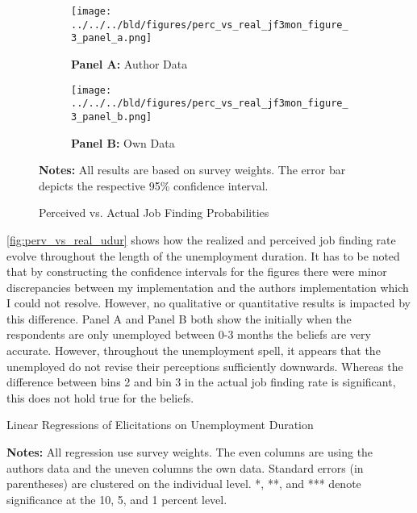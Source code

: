 \documentclass[11pt,a4paper,leqno]{article}
\begin{document}

\begin{center}
	
\end{center}

\begin{figure}[H]
	\begin{subfigure}[b]{0.5\textwidth}
		\centering
		\caption*{\scriptsize{\textbf{Panel A:} Author Data}} \vspace{-.25cm}
		 \texttt{[image: ../../../bld/figures/perc\_vs\_real\_jf3mon\_figure\_3\_panel\_a.png]}
		
	\end{subfigure}
	\begin{subfigure}[b]{0.5\textwidth}
		\centering
		\caption*{\scriptsize{\textbf{Panel B:} Own Data}} \vspace{-.25cm}
		 \texttt{[image: ../../../bld/figures/perc\_vs\_real\_jf3mon\_figure\_3\_panel\_b.png]}
	\end{subfigure}
\begin{minipage}[center]{\textwidth}
	\caption*{ \scriptsize \textbf{Notes:} All results are based on survey weights. The error bar depicts the respective 95\% confidence interval.}
\end{minipage}
  \caption{Perceived vs. Actual Job Finding Probabilities}
\label{fig:perv_vs_real_udur}
\end{figure}

\autoref{fig:perv_vs_real_udur} shows how the realized and perceived job finding rate evolve throughout the length of the unemployment duration. It has to be noted that by constructing the confidence intervals for the figures there were minor discrepancies between my implementation and the authors implementation which I could not resolve. However, no qualitative or quantitative results is impacted by this difference. Panel A and Panel B both show the initially when the respondents are only unemployed between 0-3 months the beliefs are very accurate. However, throughout the unemployment spell, it appears that the unemployed do not revise their perceptions sufficiently downwards. Whereas the difference between bins 2 and bin 3 in the actual job finding rate is significant, this does not hold true for the beliefs. 

\begin{table}[!htbp] \centering 
\caption{Linear Regressions of Elicitations on Unemployment Duration}
\label{tab:realized_perc_table4}

\begin{minipage}[center]{.9\textwidth}
	\caption*{ \scriptsize \textbf{Notes:} All regression use survey weights. The even columns are using the authors data and the uneven columns the own data. Standard errors (in parentheses) are clustered on the individual level. *, **, and *** denote significance at the 10, 5, and 1 percent level.}
\end{minipage}
\end{table}
\end{document}
